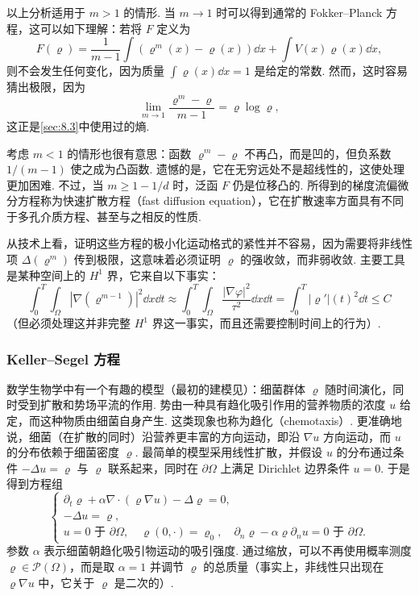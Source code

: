 以上分析适用于 $m>1$ 的情形. 当 $m\to1$ 时可以得到通常的 Fokker--Planck 方程，这可以如下理解：若将 $F$ 定义为
\[
F(\varrho)=\frac1{m-1}\int(\varrho^m(x)-\varrho(x))\dd x+\int V(x)\varrho(x)\dd x,
\]
则不会发生任何变化，因为质量 $\int\varrho(x)\dd x=1$ 是给定的常数. 然而，这时容易猜出极限，因为
\[
\lim_{m\to1}\frac{\varrho^m-\varrho}{m-1}=\varrho\log\varrho,
\]
\label{idx:i51-p305}
这正是\autoref{sec:8.3}中使用过的熵.

\label{idx:i60-p304}
考虑 $m<1$ 的情形也很有意思：函数 $\varrho^m-\varrho$ 不再凸，而是凹的，但负系数 $1/(m-1)$ 使之成为凸函数. 遗憾的是，它在无穷远处不是超线性的，这使处理更加困难. 不过，当 $m\geq1-1/d$ 时，泛函 $F$ 仍是位移凸的. 所得到的梯度流偏微分方程称为快速扩散方程（fast diffusion equation），它在扩散速率方面具有不同于多孔介质方程、甚至与之相反的性质.

从技术上看，证明这些方程的极小化运动格式的紧性并不容易，因为需要将非线性项 $\Delta(\varrho^m)$ 传到极限，这意味着必须证明 $\varrho$ 的强收敛，而非弱收敛. 主要工具是某种空间上的 $H^1$ 界，它来自以下事实：
\begin{equation}\label{eq:8.15}
\int_0^T\int_\Omega|\nabla(\varrho^{m-1})|^2\dd x\dd t
\approx\int_0^T\int_\Omega\frac{|\nabla\varphi|^2}{\tau^2}\dd x\dd t
=\int_0^T|\varrho'|(t)^2\dd t\leq C
\end{equation}
（但必须处理这并非完整 $H^1$ 界这一事实，而且还需要控制时间上的行为）.

\subsubsection*{Keller--Segel 方程}
\label{idx:i23-p305}
数学生物学中有一个有趣的模型（最初的建模见\cite{b201,b202}）：细菌群体 $\varrho$ 随时间演化，同时受到扩散和势场平流的作用. 势由一种具有趋化吸引作用的营养物质的浓度 $u$ 给定，而这种物质由细菌自身产生. 这类现象也称为趋化（chemotaxis）. 更准确地说，细菌（在扩散的同时）沿营养更丰富的方向运动，即沿 $\nabla u$ 方向运动，而 $u$ 的分布依赖于细菌密度 $\varrho$. 最简单的模型采用线性扩散，并假设 $u$ 的分布通过条件 $-\Delta u=\varrho$ 与 $\varrho$ 联系起来，同时在 $\partial\Omega$ 上满足 Dirichlet 边界条件 $u=0$. 于是得到方程组
\[
\begin{cases}
\partial_t\varrho+\alpha\nabla\cdot(\varrho\nabla u)-\Delta\varrho=0,\\
-\Delta u=\varrho,\\
u=0\text{ 于 }\partial\Omega,\quad\varrho(0,\cdot)=\varrho_0,
\quad\partial_n\varrho-\alpha\varrho\partial_n u=0\text{ 于 }\partial\Omega.
\end{cases}
\]
参数 $\alpha$ 表示细菌朝趋化吸引物运动的吸引强度. 通过缩放，可以不再使用概率测度 $\varrho\in\mathscr P(\Omega)$，而是取 $\alpha=1$ 并调节 $\varrho$ 的总质量（事实上，非线性只出现在 $\varrho\nabla u$ 中，它关于 $\varrho$ 是二次的）.

